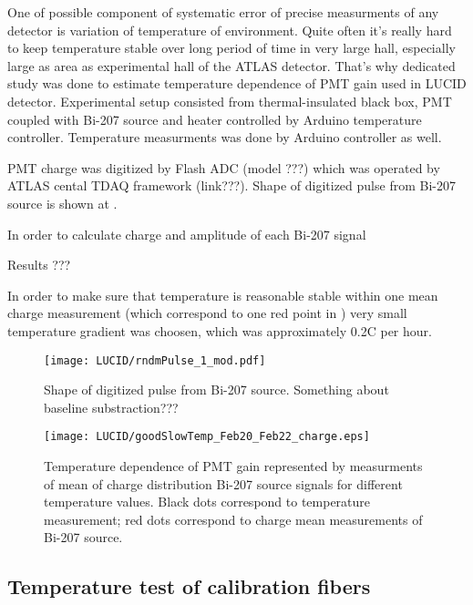 One of possible component of systematic error of precise measurments of any detector is variation of temperature of environment.
Quite often it's really hard to keep temperature stable over long period of time in very large hall, especially large as area as experimental hall of the ATLAS detector.
That's why dedicated study was done to estimate temperature dependence of PMT gain used in LUCID detector.
Experimental setup consisted from thermal-insulated black box, PMT coupled with Bi-207 source and heater controlled by Arduino temperature controller.
Temperature measurments was done by Arduino controller as well.

PMT charge was digitized by Flash ADC (model ???) which was operated by ATLAS cental TDAQ framework (link???).
Shape of digitized pulse from Bi-207 source is shown at . 

In order to calculate charge and amplitude of each Bi-207 signal 

Results ???

In order to make sure that temperature is reasonable stable within one mean charge measurement (which correspond to one red point in ) 
very small temperature gradient was choosen, which was approximately 0.2\degree C per hour. 


\begin{figure}
\centering
\texttt{[image: LUCID/rndmPulse\_1\_mod.pdf]}
\caption{Shape of digitized pulse from Bi-207 source. Something about baseline substraction??? }
\label{fig:bi207DigitizedPulse}
\end{figure}


\begin{figure}
\centering
\texttt{[image: LUCID/goodSlowTemp\_Feb20\_Feb22\_charge.eps]}
\caption{Temperature dependence of PMT gain represented by measurments of mean of charge distribution Bi-207 source signals for different temperature values.
Black dots correspond to temperature measurement; red dots correspond to charge mean measurements of Bi-207 source.}
\label{fig:PMTChargeTempDep}
\end{figure}


\subsection{Temperature test of calibration fibers}


